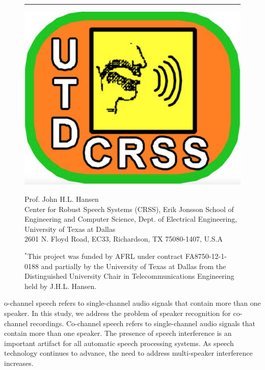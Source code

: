 \documentclass[journal]{IEEEtran}
\begin{document}
\begin{figure}[b]
	\hrule
	\vspace{.03cm}
	{}
	\begin{minipage}{0.2\linewidth}
		\centering
		\includegraphics[width=1\linewidth]{figures/CRSS_logo}
	\end{minipage}
	\begin{minipage}{0.8\linewidth}
		\begin{singlespace}
			\small \vspace{.5cm}
			\footnotesize
			Prof. John H.L. Hansen\\
			Center for Robust Speech Systems (CRSS), Erik Jonsson School of Engineering and Computer Science, Dept. of
			Electrical Engineering, University of Texas at Dallas\\
			2601 N. Floyd Road, EC33, Richardson, TX 75080-1407, U.S.A\\
		\end{singlespace}
	\end{minipage}
	\small{$^*$This project was funded by AFRL under contract FA8750-12-1-0188 and partially by the University of Texas at Dallas from the Distinguished University Chair in Telecommunications Engineering held by J.H.L. Hansen.}\\
\end{figure}


o-channel speech refers to single-channel audio signals that contain more than one speaker. 
In this study, we address the problem of speaker recognition for co-channel recordings.
Co-channel speech refers to single-channel audio signals that contain more than one speaker. 
The presence of speech interference is an important artifact for all automatic speech processing systems. 
As speech technology continues to advance, the need to address multi-speaker interference increases. 
\end{document}
